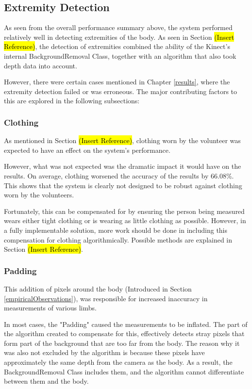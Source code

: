 \subsection{Extremity Detection}
As seen from the overall performance summary above, the system performed relatively well in detecting extremities of the body. As seen in Section \hl{(Insert Reference)}, the detection of extremities combined the ability of the Kinect's internal BackgroundRemoval Class, together with an algorithm that also took depth data into account.  

However, there were certain cases mentioned in Chapter \ref{results}, where the extremity detection failed or was erroneous. The major contributing factors to this are explored in the following subsections:

\subsubsection{Clothing}
As mentioned in Section \hl{(Insert Reference)}, clothing worn by the volunteer was expected to have an effect on the system's performance. 

However, what was not expected was the dramatic impact it would have on the results. On average, clothing worsened the accuracy of the results by 66.08\%. This shows that the system is clearly not designed to be robust against clothing worn by the volunteers.

Fortunately, this can be compensated for by ensuring the person being measured wears either tight clothing or is wearing as little clothing as possible. However, in a fully implementable solution, more work should be done in including this compensation for clothing algorithmically. Possible methods are explained in Section \hl{(Insert Reference)}. 

\subsubsection{Padding}
This addition of pixels around the body (Introduced in Section \ref{empiricalObservations}), was responsible for increased inaccuracy in measurements of various limbs. 

In most cases, the "Padding" caused the measurements to be inflated. The part of the algorithm created to compensate for this, effectively detects stray pixels that form part of the background that are too far from the body. The reason why it was also not excluded by the algorithm is because these pixels have approximately the same depth from the camera as the body. As a result, the BackgroundRemoval Class includes them, and the algorithm cannot differentiate between them and the body. 

